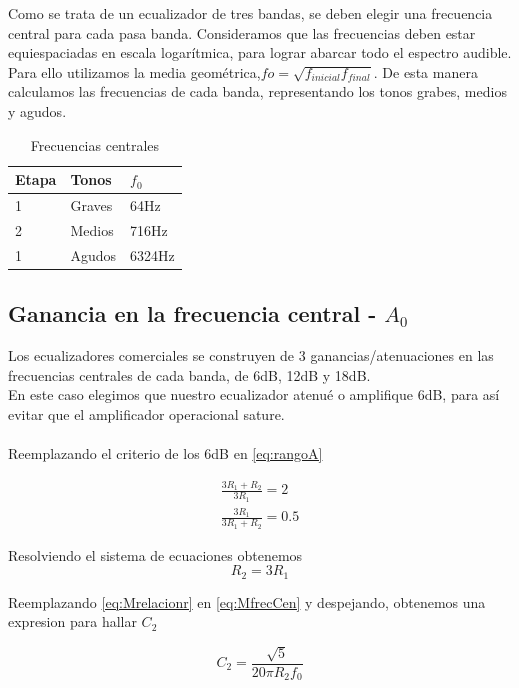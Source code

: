 \documentclass[../../tc_tp3_main.tex]{subfiles}
\begin{document}
Como se trata de un ecualizador de tres bandas, se deben elegir una frecuencia central para cada  pasa banda. Consideramos que las frecuencias deben estar equiespaciadas en escala logarítmica, para lograr abarcar todo el espectro audible.
Para ello utilizamos la media geométrica,$fo=\sqrt{f_{inicial}f_{final}}$. De esta manera calculamos las frecuencias de cada banda, representando los tonos grabes, medios y agudos.
\begin{table}[h]
\begin{center}
\begin{tabular}{|l|l|l|}
\hline
Etapa & Tonos & $f_0$ \\
\hline \hline
1&Graves  &64Hz \\ \hline
2&Medios  &716Hz \\ \hline
1&Agudos  &6324Hz \\ \hline

\end{tabular}
\caption{Frecuencias centrales} 
\label{tab:MFc}
\end{center}
\end{table}

\subsection{Ganancia en la frecuencia central - $A_0$}

Los ecualizadores comerciales se construyen de 3 ganancias/atenuaciones en las frecuencias centrales de cada banda, de 6dB, 12dB y 18dB.
\\En este caso elegimos que nuestro ecualizador atenué o amplifique 6dB, para así evitar que el amplificador operacional sature.
\\
\\Reemplazando el criterio de los 6dB en \ref{eq:rangoA}

\begin{gather}
 \frac{3R_1 + R_2}{3R_1}=2\\
\frac {3R_1}{3R_1 + R_2} =0.5
\end{gather}

Resolviendo el sistema de ecuaciones obtenemos
\begin{equation}
R_2=3R_1 \label{eq:Mrelacionr}
\end{equation}

Reemplazando \ref{eq:Mrelacionr} en \ref{eq:MfrecCen} y despejando, obtenemos una expresion para hallar $C_2$

\begin{equation}
C_2=\frac{\sqrt{5}}{20 \pi R_2 f_0}
\end{equation}
\end{document}
